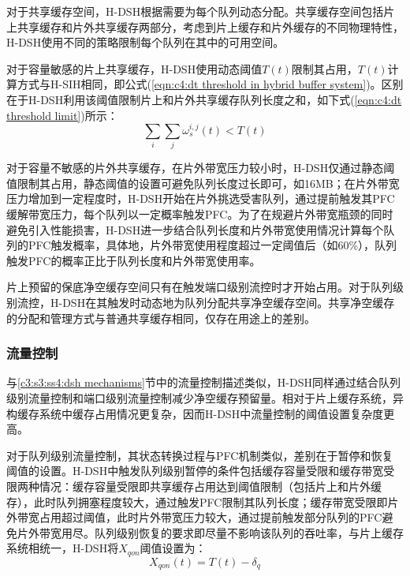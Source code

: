 对于共享缓存空间，H-DSH根据需要为每个队列动态分配。共享缓存空间包括片上共享缓存和片外共享缓存两部分，考虑到片上缓存和片外缓存的不同物理特性，H-DSH使用不同的策略限制每个队列在其中的可用空间。

对于容量敏感的片上共享缓存，H-DSH使用动态阈值$T(t)$限制其占用，$T(t)$计算方式与H-SIH相同，即公式(\ref{eqn:c4:dt threshold in hybrid buffer system})。区别在于H-DSH利用该阈值限制片上和片外共享缓存队列长度之和，如下式(\ref{eqn:c4:dt threshold limit})所示：
\begin{equation}
  \sum_{i} \sum_{j} \omega_{s}^{i,j}(t) < T(t)
  \label{eqn:c4:dt threshold limit}
\end{equation}


对于容量不敏感的片外共享缓存，在片外带宽压力较小时，H-DSH仅通过静态阈值限制其占用，静态阈值的设置可避免队列长度过长即可，如16MB；在片外带宽压力增加到一定程度时，H-DSH开始在片外挑选受害队列，通过提前触发其PFC缓解带宽压力，每个队列以一定概率触发PFC。为了在规避片外带宽瓶颈的同时避免引入性能损害，H-DSH进一步结合队列长度和片外带宽使用情况计算每个队列的PFC触发概率，具体地，片外带宽使用程度超过一定阈值后（如60\%），队列触发PFC的概率正比于队列长度和片外带宽使用率。

片上预留的保底净空缓存空间只有在触发端口级别流控时才开始占用。对于队列级别流控，H-DSH在其触发时动态地为队列分配共享净空缓存空间。共享净空缓存的分配和管理方式与普通共享缓存相同，仅存在用途上的差别。

\subsubsection{流量控制}

与\ref{c3:s3:ss4:dsh mechanisms}节中的流量控制描述类似，H-DSH同样通过结合队列级别流量控制和端口级别流量控制减少净空缓存预留量。相对于片上缓存系统，异构缓存系统中缓存占用情况更复杂，因而H-DSH中流量控制的阈值设置复杂度更高。

对于队列级别流量控制，其状态转换过程与PFC机制类似，差别在于暂停和恢复阈值的设置。H-DSH中触发队列级别暂停的条件包括缓存容量受限和缓存带宽受限两种情况：缓存容量受限即共享缓存占用达到阈值限制（包括片上和片外缓存），此时队列拥塞程度较大，通过触发PFC限制其队列长度；缓存带宽受限即片外带宽占用超过阈值，此时片外带宽压力较大，通过提前触发部分队列的PFC避免片外带宽用尽。队列级别恢复的要求即尽量不影响该队列的吞吐率，与片上缓存系统相统一，H-DSH将$X_{qon}$阈值设置为：
\begin{equation}
  X_{qon}(t) = T(t) - \delta_q
  \label{eqn:c4:qon threshold}
\end{equation}

